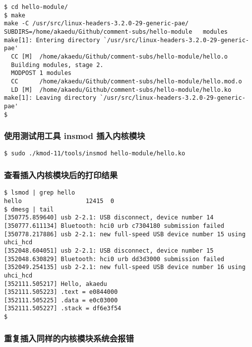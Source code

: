 \documentclass[11pt,a4paper]{article}
\begin{document}
{\begin{shaded}\begin{verbatim}
$ cd hello-module/ 
$ make
make -C /usr/src/linux-headers-3.2.0-29-generic-pae/    SUBDIRS=/home/akaedu/Github/comment-subs/hello-module   modules
make[1]: Entering directory `/usr/src/linux-headers-3.2.0-29-generic-pae'
  CC [M]  /home/akaedu/Github/comment-subs/hello-module/hello.o
  Building modules, stage 2.
  MODPOST 1 modules
  CC      /home/akaedu/Github/comment-subs/hello-module/hello.mod.o
  LD [M]  /home/akaedu/Github/comment-subs/hello-module/hello.ko
make[1]: Leaving directory `/usr/src/linux-headers-3.2.0-29-generic-pae'
$ 
\end{verbatim}\end{shaded}}
\subsubsection{使用测试用工具 insmod 插入内核模块}

{\begin{shaded}\begin{verbatim}
$ sudo ./kmod-11/tools/insmod hello-module/hello.ko 
\end{verbatim}\end{shaded}}
\subsubsection{查看插入内核模块后的打印结果}

{\begin{shaded}\begin{verbatim}
$ lsmod | grep hello
hello                  12415  0 
$ dmesg | tail
[350775.859640] usb 2-2.1: USB disconnect, device number 14
[350777.611134] Bluetooth: hci0 urb c7304180 submission failed
[350778.217886] usb 2-2.1: new full-speed USB device number 15 using uhci_hcd
[352048.604051] usb 2-2.1: USB disconnect, device number 15
[352048.630829] Bluetooth: hci0 urb dd3d3000 submission failed
[352049.254135] usb 2-2.1: new full-speed USB device number 16 using uhci_hcd
[352111.505217] Hello, akaedu
[352111.505223] .text = e0844000
[352111.505225] .data = e0c03000
[352111.505227] .stack = df6e3f54
$ 
\end{verbatim}\end{shaded}}
\subsubsection{重复插入同样的内核模块系统会报错}
\end{document}
